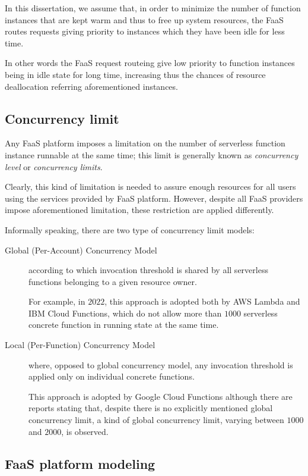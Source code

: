 \documentclass[12pt,a4paper]{report}
\theoremstyle{definition}
\begin{document}
In this dissertation, we assume that, in order to minimize the number of
function instances that are kept warm and thus to free up system resources, the FaaS routes requests giving priority to instances which they have been idle for less time.

In other words the FaaS request routeing give low priority to function instances being in idle state for long time, increasing thus the chances of resource deallocation referring aforementioned instances.

\subsection{Concurrency limit}

Any FaaS platform imposes a limitation on the number of serverless function instance runnable at the same time; this limit is generally known as \textit{concurrency level} or \textit{concurrency limits}. 

Clearly, this kind of limitation is needed to assure enough resources for all users using the services provided by FaaS platform. However, despite all FaaS providers impose aforementioned limitation, these restriction are applied differently.

Informally speaking, there are two type of concurrency limit models:

\begin{description}
	\item[Global (Per-Account) Concurrency Model] according to which invocation threshold is shared by all serverless functions belonging to a given resource owner. 
	
	For example, in $2022$, this approach is adopted both by AWS Lambda and IBM Cloud Functions, which do not allow more than $1000$ serverless concrete function in running state at the same time.
	
	\item[Local (Per-Function) Concurrency Model] where, opposed to global concurrency model, any invocation threshold is applied only on individual concrete functions. 
	
	This approach is adopted by Google Cloud Functions although there are reports stating that, despite there is no explicitly mentioned global concurrency limit, a kind of global concurrency limit, varying between $1000$ and $2000$, is observed.
	
\end{description}

\subsection{FaaS platform modeling}
\end{document}
